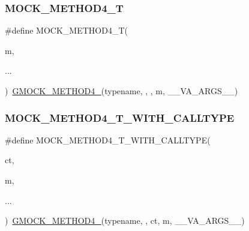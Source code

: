 \mbox{\label{googletest-master_2googlemock_2include_2gmock_2gmock-generated-function-mockers_8h_a17dde4ac8109f0bf1b73e3509e42c879}} 
\subsubsection{\texorpdfstring{MOCK\_METHOD4\_T}{MOCK\_METHOD4\_T}}
{\footnotesize\ttfamily \#define M\+O\+C\+K\+\_\+\+M\+E\+T\+H\+O\+D4\+\_\+T(\begin{DoxyParamCaption}\item[{}]{m,  }\item[{}]{... }\end{DoxyParamCaption})~\mbox{\hyperlink{_obj__test_2lib_2googletest-release-1_88_81_2googlemock_2include_2gmock_2gmock-generated-function-mockers_8h_ab6430f2cfad9de4aca5258ea559294bb}{G\+M\+O\+C\+K\+\_\+\+M\+E\+T\+H\+O\+D4\+\_\+}}(typename, , , m, \+\_\+\+\_\+\+V\+A\+\_\+\+A\+R\+G\+S\+\_\+\+\_\+)}

\mbox{\label{googletest-master_2googlemock_2include_2gmock_2gmock-generated-function-mockers_8h_aae18ec395b1ba3e991a25ffb997821ee}} 
\subsubsection{\texorpdfstring{MOCK\_METHOD4\_T\_WITH\_CALLTYPE}{MOCK\_METHOD4\_T\_WITH\_CALLTYPE}}
{\footnotesize\ttfamily \#define M\+O\+C\+K\+\_\+\+M\+E\+T\+H\+O\+D4\+\_\+\+T\+\_\+\+W\+I\+T\+H\+\_\+\+C\+A\+L\+L\+T\+Y\+PE(\begin{DoxyParamCaption}\item[{}]{ct,  }\item[{}]{m,  }\item[{}]{... }\end{DoxyParamCaption})~\mbox{\hyperlink{_obj__test_2lib_2googletest-release-1_88_81_2googlemock_2include_2gmock_2gmock-generated-function-mockers_8h_ab6430f2cfad9de4aca5258ea559294bb}{G\+M\+O\+C\+K\+\_\+\+M\+E\+T\+H\+O\+D4\+\_\+}}(typename, , ct, m, \+\_\+\+\_\+\+V\+A\+\_\+\+A\+R\+G\+S\+\_\+\+\_\+)}

